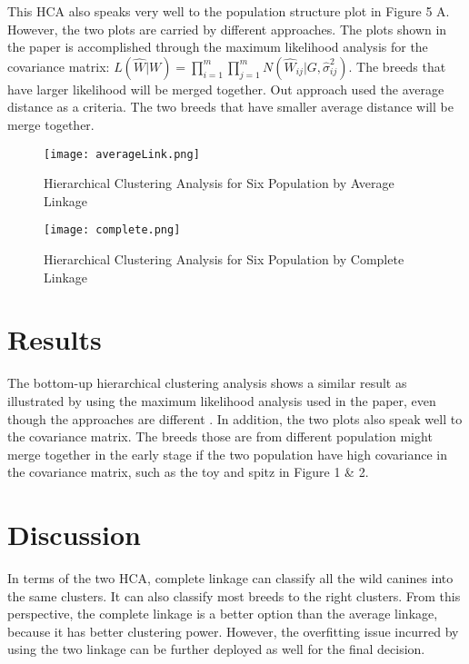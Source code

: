 \documentclass{article} %
\begin{document}
This HCA also speaks very well to the population structure plot in Figure 5 A. However, the two plots are carried by different approaches. The plots shown in the paper is accomplished through the maximum likelihood analysis for the covariance matrix: $L(\hat{W}|W)=\prod_{i=1}^m\prod_{j=1}^mN(\hat{W}_{ij}|G, \hat{\sigma}_{ij}^2)$. The breeds that have larger likelihood will be merged together. Out approach used the average distance as a criteria. The two breeds that have smaller average distance will be merge together. 



\begin{figure}[H]
\centering
\caption{Hierarchical Clustering Analysis for Six Population by Average Linkage}
\texttt{[image: averageLink.png]}
\label{fig:boat666}
\end{figure}



\begin{figure}[H]
\centering
\caption{Hierarchical Clustering Analysis for Six Population by Complete Linkage}
\texttt{[image: complete.png]}
\label{fig:boat666}
\end{figure}

\section{Results}

The bottom-up hierarchical clustering analysis shows a similar result as illustrated by using the maximum likelihood analysis used in the paper, even though the approaches are different . In addition, the two plots also speak well to the covariance matrix. The breeds those are from different population might merge together in the early stage if the two population have high covariance in the covariance matrix, such as the toy and spitz in Figure 1 \& 2. 

\section{Discussion}

In terms of the two HCA, complete linkage can classify all the wild canines into the same clusters. It can also classify most breeds to the right clusters. From this perspective, the complete linkage is a better option than the average linkage, because it has better clustering power. However, the overfitting issue incurred by using the two linkage can be further deployed as well for the final decision. 
\end{document}
